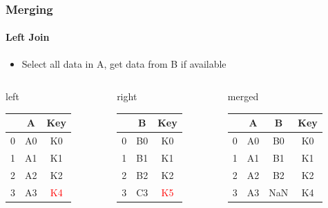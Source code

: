 \documentclass[english]{beamer}
\def\firstcircle{(0,0) circle (2cm)}
\def\secondcircle{(0:3cm) circle (2cm)}
\begin{document}
\begin{frame}
\frametitle{Merging}
\framesubtitle{Left Join}

\begin{itemize}
\item Select all data in A, get data from B if available
\end{itemize}

\begin{center}
\end{center}

{\footnotesize
\begin{columns}
\begin{column}{0.3\textwidth}
left \\
\begin{tabular}{c|cc} \toprule
   & A  &  Key \\ \midrule
0 & A0 &  K0 \\
1 & A1 &  K1 \\ 
2 & A2 &  K2 \\
3 & A3 &  \textcolor{red}{K4} \\ \bottomrule
\end{tabular}
\end{column}
\begin{column}{0.3\textwidth}
right \\
\begin{tabular}{c|cc} \toprule
   &  B   & Key \\ \midrule
0 &  B0 & K0 \\
1 &  B1 & K1 \\ 
2 &  B2 & K2 \\
3 &  C3 & \textcolor{red}{K5} \\ \bottomrule
\end{tabular}\end{column}
\begin{column}{0.3\textwidth}
merged \\
\begin{tabular}{c|ccc} \toprule
   & A  & B   & Key \\ \midrule
0 & A0 & B0 & K0 \\
1 & A1 & B1 & K1 \\ 
2 & A2 & B2 & K2 \\ \bottomrule
3 & A3 & NaN & K4 \\ \bottomrule
\end{tabular} \\
\vspace*{0.4em}
\end{column}
\end{columns}}

\end{frame}
\end{document}
